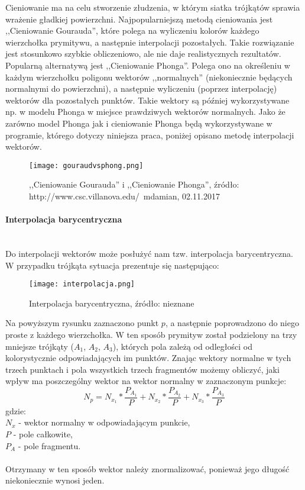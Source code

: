 Cieniowanie ma na celu stworzenie złudzenia, w którym siatka trójkątów sprawia wrażenie gładkiej powierzchni. Najpopularniejszą metodą cieniowania jest ,,Cieniowanie Gourauda'', które polega na wyliczeniu kolorów każdego wierzchołka prymitywu, a następnie interpolacji pozostałych. Takie rozwiązanie jest stosunkowo szybkie obliczeniowo, ale nie daje realistycznych rezultatów. Popularną alternatywą jest ,,Cieniowanie Phonga''. Polega ono na określeniu w każdym wierzchołku poligonu wektorów ,,normalnych'' (niekoniecznie będących normalnymi do powierzchni), a następnie wyliczeniu (poprzez interpolację) wektorów dla pozostałych punktów. Takie wektory są później wykorzystywane np. w modelu Phonga w miejsce prawdziwych wektorów normalnych. Jako że zarówno model Phonga jak i cieniowanie Phonga będą wykorzystywane w programie, którego dotyczy niniejsza praca, poniżej opisano metodę interpolacji wektorów.

\begin{figure}[h!]
\centering
  \texttt{[image: gouraudvsphong.png]}
  \caption{,,Cieniowanie Gourauda'' i ,,Cieniowanie Phonga'', źródło: http://www.csc.villanova.edu/~mdamian, 02.11.2017}
\end{figure}


\paragraph{Interpolacja barycentryczna}\mbox{} \\

Do interpolacji wektorów może posłużyć nam tzw. interpolacja barycentryczna. W przypadku trójkąta sytuacja prezentuje się następująco:

\begin{figure}[H]
\centering
  \texttt{[image: interpolacja.png]}
  \caption{Interpolacja barycentryczna, źródło: nieznane}
\end{figure}

Na powyższym rysunku zaznaczono punkt $p$, a następnie poprowadzono do niego proste z każdego wierzchołka. W ten sposób prymityw został podzielony na trzy mniejsze trójkąty ($A_1$, $A_2$, $A_3$), których pola zależą od odległości od kolorystycznie odpowiadających im punktów. Znając wektory normalne w tych trzech punktach i pola wszystkich trzech fragmentów możemy obliczyć, jaki wpływ ma poszczególny wektor na wektor normalny w zaznaczonym punkcje:
$$N_p = N_{x_1} * \frac{P_{A_1}}{P} + N_{x_2} * \frac{P_{A_2}}{P} + N_{x_3} * \frac{P_{A_3}}{P}$$
gdzie: \\
$N_x$ - wektor normalny w odpowiadającym punkcie, \\
$P$ - pole całkowite, \\ 
$P_A$ - pole fragmentu. \\
\\
Otrzymany w ten sposób wektor należy znormalizować, ponieważ jego długość niekoniecznie wynosi jeden.

